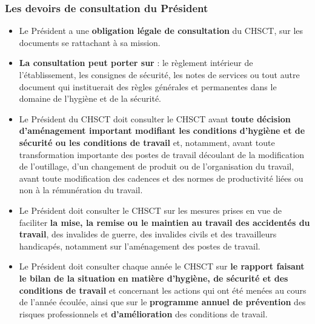 \documentclass{beamer}
\begin{document}
\begin{frame}
\frametitle{Les devoirs de consultation du Président}

 
\begin{itemize}
\item Le Président a une \textbf{obligation légale de consultation} du CHSCT, sur les documents se rattachant à sa mission.

\item\textbf{ La consultation peut porter sur} : le règlement intérieur de l’établissement, les consignes de sécurité, les notes de services ou tout autre document qui instituerait des règles générales et permanentes dans le domaine de l’hygiène et de la sécurité.

\item Le Président du CHSCT doit consulter le CHSCT avant \textbf{toute décision d’aménagement important modifiant les conditions d'hygiène et de sécurité ou les conditions de travail} et, notamment, avant toute transformation importante des postes de travail découlant de la modification de l'outillage, d'un changement de produit ou de l'organisation du travail, avant toute modification des cadences et des normes de productivité liées ou non à la rémunération du travail.

\item Le Président doit consulter le CHSCT sur les mesures prises en vue de faciliter \textbf{la mise, la remise ou le maintien au travail des accidentés du travail}, des invalides de guerre, des invalides civils et des travailleurs handicapés, notamment sur l'aménagement des postes de travail.

\item Le Président doit consulter chaque année le CHSCT sur \textbf{le rapport faisant le bilan de la situation en matière d’hygiène, de sécurité et des conditions de travail} et concernant les actions qui ont été menées au cours de l’année écoulée, ainsi que sur le\textbf{ programme annuel de prévention} des risques professionnels et \textbf{d’amélioration} des conditions de travail.
\end{itemize}
\end{frame}
\end{document}
